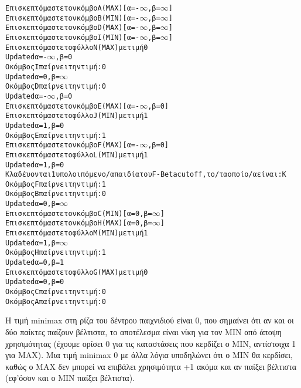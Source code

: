 \documentclass{article}
\begin{document}
\begin{alltt}
Επισκεπτόμαστε τον κόμβο \textlatin{A} (\textlatin{MAX}) [α=-\(\infty\), β=\(\infty\)]
  Επισκεπτόμαστε τον κόμβο \textlatin{B} (\textlatin{MIN}) [α=-\(\infty\), β=\(\infty\)]
    Επισκεπτόμαστε τον κόμβο \textlatin{D} (\textlatin{MAX}) [α=-\(\infty\), β=\(\infty\)]
      Επισκεπτόμαστε τον κόμβο \textlatin{I} (\textlatin{MIN}) [α=-\(\infty\), β=\(\infty\)]
        Επισκεπτόμαστε το φύλλο \textlatin{N} (\textlatin{MAX}) με τιμή 0
      \textlatin{Updated} α=-\(\infty\), β=0
      Ο κόμβος \textlatin{I} παίρνει την τιμή: 0
    \textlatin{Updated} α=0, β=\(\infty\)
    Ο κόμβος \textlatin{D} παίρνει την τιμή: 0
  \textlatin{Updated} α=-\(\infty\), β=0
    Επισκεπτόμαστε τον κόμβο \textlatin{E} (\textlatin{MAX}) [α=-\(\infty\), β=0]
      Επισκεπτόμαστε το φύλλο \textlatin{J} (\textlatin{MIN}) με τιμή 1
    \textlatin{Updated} α=1, β=0
    Ο κόμβος \textlatin{E} παίρνει την τιμή: 1
    Επισκεπτόμαστε τον κόμβο \textlatin{F} (\textlatin{MAX}) [α=-\(\infty\), β=0]
      Επισκεπτόμαστε το φύλλο \textlatin{L} (\textlatin{MIN}) με τιμή 1
    \textlatin{Updated} α=1, β=0
    Κλαδέυονται 1 υπολοιπόμενο/α παιδία του \textlatin{F} - Beta cutoff, το/τα οποίο/α είναι: \textlatin{K}
    Ο κόμβος \textlatin{F} παίρνει την τιμή: 1
  Ο κόμβος \textlatin{B} παίρνει την τιμή: 0
\textlatin{Updated} α=0, β=\(\infty\)
  Επισκεπτόμαστε τον κόμβο \textlatin{C} (\textlatin{MIN}) [α=0, β=\(\infty\)]
    Επισκεπτόμαστε τον κόμβο \textlatin{H} (\textlatin{MAX}) [α=0, β=\(\infty\)]
      Επισκεπτόμαστε το φύλλο \textlatin{M} (\textlatin{MIN}) με τιμή 1
    \textlatin{Updated} α=1, β=\(\infty\)
    Ο κόμβος \textlatin{H} παίρνει την τιμή: 1
  \textlatin{Updated} α=0, β=1
    Επισκεπτόμαστε το φύλλο \textlatin{G} (\textlatin{MAX}) με τιμή 0
  \textlatin{Updated} α=0, β=0
  Ο κόμβος \textlatin{C} παίρνει την τιμή: 0
Ο κόμβος \textlatin{A} παίρνει την τιμή: 0
\end{alltt}

Η τιμή \textlatin{minimax} στη ρίζα του δέντρου παιχνιδιού είναι 0, που σημαίνει ότι αν και οι δύο παίκτες παίζουν βέλτιστα, το αποτέλεσμα είναι νίκη για τον \textlatin{MIN} από άποψη χρησιμότητας (έχουμε ορίσει 0 για τις καταστάσεις που κερδίζει ο \textlatin{MIN}, αντίστοιχα 1 για \textlatin{MAX}).
Μια τιμή \textlatin{minimax} 0 με άλλα λόγια υποδηλώνει ότι ο \textlatin{MIN} θα κερδίσει, καθώς ο \textlatin{MAX} δεν μπορεί να επιβάλει χρησιμότητα +1 ακόμα και αν παίξει βέλτιστα (εφ'όσον και ο \textlatin{MIN} παίξει βέλτιστα).
\end{document}
